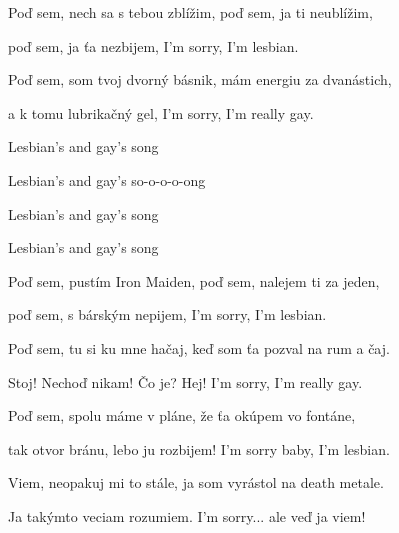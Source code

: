 \begin{song}


 \quad

\large


\Large

\bigskip

 Poď sem, nech sa s tebou zblížim,  poď sem, ja ti neublížim, \par
{} poď sem, ja ťa nezbijem,  I'm sorry, I'm lesbian. \par
{} Poď sem, som tvoj dvorný básnik,  mám energiu za dvanástich, \par
{} a k tomu lubrikačný gel,  I'm sorry, I'm really gay. \par

\bigskip

\begin{chorusbox}{\Refren}
Lesbian's and gay's song \par
{}Lesbian's and gay's so-o-o-o-ong \par
{}Lesbian's and gay's song \par
{}Lesbian's and gay's song \par
\end{chorusbox}

\bigskip

 Poď sem, pustím Iron Maiden,  poď sem, nalejem ti za jeden, \par
{} poď sem, s bárským nepijem,  I'm sorry, I'm lesbian. \par
{} Poď sem, tu si ku mne hačaj,  keď som ťa pozval na rum a čaj. \par
{} Stoj! Nechoď nikam! Čo je? Hej!  I'm sorry, I'm really gay. \par

\bigskip

\Refren

\bigskip

 Poď sem, spolu máme v pláne,  že ťa okúpem vo fontáne, \par
{} tak otvor bránu, lebo ju rozbijem!  I'm sorry baby, I'm lesbian. \par
{} Viem, neopakuj mi to stále,  ja som vyrástol na death metale. \par
{} Ja takýmto veciam rozumiem.  I'm sorry... ale veď ja viem! \par

\bigskip

\Refren

\end{song}
